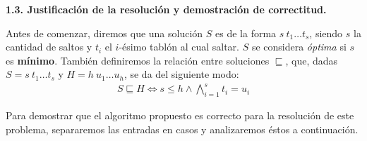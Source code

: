 \vspace*{0.75cm} \noindent



\noindent
\textbf{1.3. Justificación de la resolución y demostración de correctitud.}

\vspace*{0.3cm}

Antes de comenzar, diremos que una solución $S$ es de la forma $s \ t_1 \dots t_s$,
siendo $s$ la cantidad de saltos y $t_i$ el $i$-ésimo tablón al cual saltar. $S$ se considera
\textit{óptima} si $s$ es \textbf{mínimo}. También definiremos la relación entre soluciones $\sqsubseteq$, que,
dadas $S = s \ t_1 \dots t_s$ y $H = h \ u_1 \dots u_h$, se da del siguiente modo:
\begin{align*}
  S \sqsubseteq H \iff s \leq h \wedge \bigwedge_{i=1}^s t_i = u_i
\end{align*}

Para demostrar que el algoritmo propuesto es correcto para la resolución de este problema,
separaremos las entradas en casos y analizaremos éstos a continuación.

